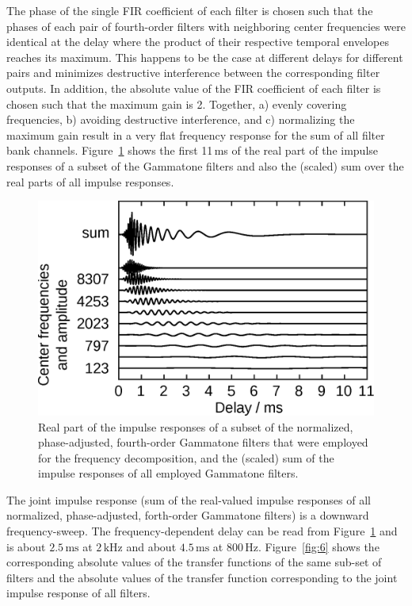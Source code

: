 \documentclass[10pt,a4paper,twocolumn]{article}
\begin{document}
%
The phase of the single FIR coefficient of each filter is chosen such that the phases of each pair of fourth-order filters with neighboring center frequencies were identical at the delay where the product of their respective temporal envelopes reaches its maximum.
%
This happens to be the case at different delays for different pairs and minimizes destructive interference between the corresponding filter outputs.
%
In addition, the absolute value of the FIR coefficient of each filter is chosen such that the maximum gain is 2.
%
Together, a) evenly covering frequencies, b) avoiding destructive interference, and c) normalizing the maximum gain result in a very flat frequency response for the sum of all filter bank channels.
%
Figure~\ref{fig:5} shows the first 11\,ms of the real part of the impulse responses of a subset of the Gammatone filters and also the (scaled) sum over the real parts of all impulse responses.
%
\begin{figure}[h]
	\centerline{\includegraphics[width=.85\columnwidth]{images/gammatone_filter_responses}}
	\caption{Real part of the impulse responses of a subset of the normalized, phase-adjusted, fourth-order Gammatone filters that were employed for the frequency decomposition, and the (scaled) sum of the impulse responses of all employed Gammatone filters.}
	\label{fig:5}
\end{figure} 
%
The joint impulse response (sum of the real-valued impulse responses of all normalized, phase-adjusted, forth-order Gammatone filters) is a downward frequency-sweep.
%
The frequency-dependent delay can be read from Figure~\ref{fig:5} and is about $2.5\,\text{ms}$ at $2\,\text{kHz}$ and about $4.5\,\text{ms}$ at $800\,\text{Hz}$.
%
Figure~\ref{fig:6} shows the corresponding absolute values of the transfer functions of the same sub-set of filters and the absolute values of the transfer function corresponding to the joint impulse response of all filters.
\end{document}
